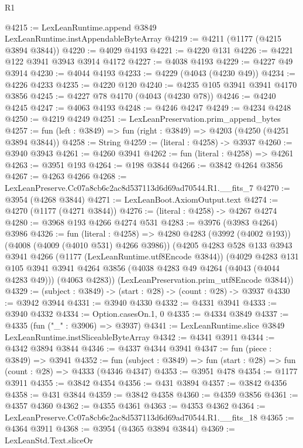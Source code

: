 \begin{lexlean}{R1}
\begin{coremodule}
@4215 := LexLeanRuntime.append @3849 LexLeanRuntime.instAppendableByteArray
@4219 := @4211 (@1177 (@4215 @3894 @3844))
@4220 := @4029 @4193
@4221 := @4220 @131
@4226 := @4221 @122 @3941 @3943 @3914 @4172
@4227 := @4038 @4193
@4229 := @4227 @49 @3914
@4230 := @4044 @4193
@4233 := @4229 (@4043 (@4230 @49))
@4234 := @4226 @4233
@4235 := @4220 @120
@4240 := @4235 @105 @3941 @3941 @4170 @3856
@4245 := @4227 @78 @4170 (@4043 (@4230 @78))
@4246 := @4240 @4245
@4247 := @4063 @4193
@4248 := @4246 @4247
@4249 := @4234 @4248
@4250 := @4219 @4249
@4251 := LexLeanPreservation.prim_append_bytes
@4257 := fun (left : @3849) => fun (right : @3849) => @4203 (@4250 (@4251 @3894 @3844))
@4258 := String
@4259 := (literal : @4258) -> @3937
@4260 := @3940 @3943
@4261 := @4260 @3941
@4262 := fun (literal : @4258) => @4261
@4263 := @3951 @193
@4264 := @198 @3844
@4266 := @3842 @4264 @3856
@4267 := @4263 @4266
@4268 := LexLeanPreserve.Cc07a8cb6c2ac8d537113d6d69ad70544.R1.__fits_7
@4270 := @3954 (@4268 @3844)
@4271 := LexLeanBoot.AxiomOutput.text
@4274 := @4270 (@1177 (@4271 @3844))
@4276 := (literal : @4258) -> @4267 @4274
@4280 := @3968 @193 @4266 @4274 @531
@4283 := @3976 (@3983 @4264) @3986
@4326 := fun (literal : @4258) =>
  @4280
    @4283
    (@3992 (@4002 @193))
    (@4008 (@4009 (@4010 @531) @4266 @3986))
    (@4205
      @4283
      @528
      @133
      @3943
      @3941
      @4266
      (@1177 (LexLeanRuntime.utf8Encode @3844))
      (@4029
        @4283
        @131
        @105
        @3941
        @3941
        @4264
        @3856
        (@4038 @4283 @49 @4264 (@4043 (@4044 @4283 @49)))
        (@4063 @4283))
      (LexLeanPreservation.prim_utf8Encode @3844))
@4329 := (subject : @3849) -> (start : @28) -> (count : @28) -> @3937
@4330 := @3942 @3944
@4331 := @3940 @4330
@4332 := @4331 @3941
@4333 := @3940 @4332
@4334 := Option.casesOn.{1, 0}
@4335 := @4334 @3849
@4337 := @4335 (fun ("_" : @3906) => @3937)
@4341 := LexLeanRuntime.slice @3849 LexLeanRuntime.instSliceableByteArray
@4342 := @4341 @3911
@4344 := @4342 @3894 @3844
@4346 := @4337 @4344 @3941
@4347 := fun (piece : @3849) => @3941
@4352 := fun (subject : @3849) => fun (start : @28) => fun (count : @28) => @4333 (@4346 @4347)
@4353 := @3951 @478
@4354 := @1177 @3911
@4355 := @3842 @4354
@4356 := @431 @3894
@4357 := @3842 @4356
@4358 := @431 @3844
@4359 := @3842 @4358
@4360 := @4359 @3856
@4361 := @4357 @4360
@4362 := @4355 @4361
@4363 := @4353 @4362
@4364 := LexLeanPreserve.Cc07a8cb6c2ac8d537113d6d69ad70544.R1.__fits_18
@4365 := @4364 @3911
@4368 := @3954 (@4365 @3894 @3844)
@4369 := LexLeanStd.Text.sliceOr

\end{coremodule}
\end{lexlean}
